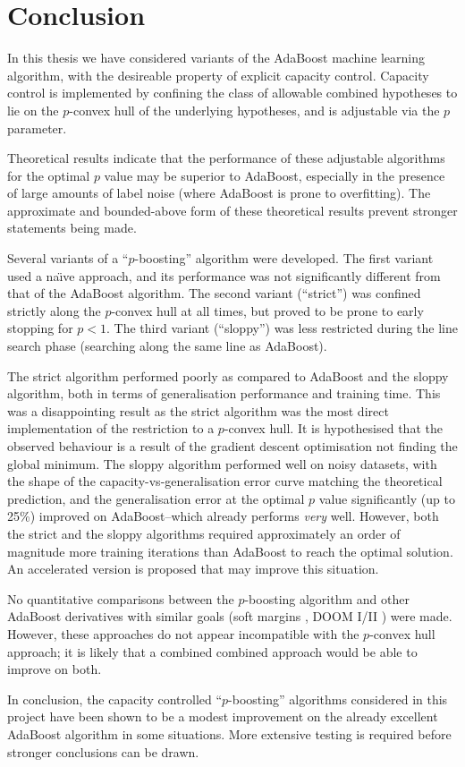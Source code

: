 
\chapter{Conclusion}
\label{chapter:conclusion}

In this thesis we have considered variants of the AdaBoost machine
learning algorithm, with the desireable property of explicit capacity
control.  Capacity control is implemented by confining the class of
allowable combined hypotheses to lie on the $p$-convex hull of the
underlying hypotheses, and is adjustable via the $p$ parameter.

Theoretical results indicate that the performance of these adjustable
algorithms for the optimal $p$ value may be superior to AdaBoost,
especially in the presence of large amounts of label noise (where
AdaBoost is prone to overfitting).  The approximate and bounded-above
form of these theoretical results prevent stronger statements being
made.

Several variants of a ``$p$-boosting'' algorithm were developed.  The
first variant used a na\"{\i}ve approach, and its performance was not
significantly different from that of the AdaBoost algorithm.  The
second variant (``strict'') was confined strictly along the $p$-convex
hull at all times, but proved to be prone to early stopping for $p <
1$.  The third variant (``sloppy'') was less restricted during the
line search phase (searching along the same line as AdaBoost).

The strict algorithm performed poorly as compared to AdaBoost and the
sloppy algorithm, both in terms of generalisation performance and
training time.  This was a disappointing result as the strict
algorithm was the most direct implementation of the restriction to a
$p$-convex hull.  It is hypothesised that the observed behaviour is a 
result of the gradient descent optimisation not finding the global
minimum.  The sloppy algorithm performed well on noisy datasets, with
the shape of the capacity-vs-generalisation error curve matching the
theoretical prediction, and the generalisation error at the optimal
$p$ value significantly (up to 25\%) improved on AdaBoost--which
already performs \emph{very} well.  However, both the strict and the
sloppy algorithms required approximately an order of magnitude more
training iterations than AdaBoost to reach the optimal solution.  An
accelerated version is proposed that may improve this situation.

No quantitative comparisons between the $p$-boosting algorithm and
other AdaBoost derivatives with similar goals (soft margins
\cite{Ratsch98}, DOOM I/II \cite{Mason99, Mason99a}) were made.
However, these approaches do not appear incompatible with the $p$-convex
hull approach; it is likely that a combined combined approach would be
able to improve on both.

In conclusion, the capacity controlled ``$p$-boosting'' algorithms
considered in this project have been shown to be a modest improvement
on the already excellent AdaBoost algorithm in some situations.  More
extensive testing is required before stronger conclusions can be
drawn.
